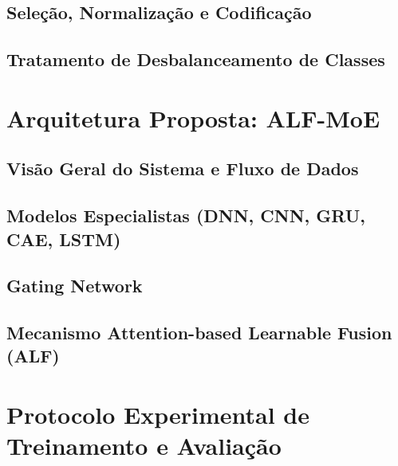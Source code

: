\subsection{Seleção, Normalização e Codificação}
\label{subsec:selecao_normalizacao}

\subsection{Tratamento de Desbalanceamento de Classes}
\label{subsec:desbalanceamento}

\section{Arquitetura Proposta: ALF-MoE}
\label{sec:arquitetura_proposta}

\subsection{Visão Geral do Sistema e Fluxo de Dados}
\label{subsec:visao_geral_alfmoe}

\subsection{Modelos Especialistas (DNN, CNN, GRU, CAE, LSTM)}
\label{subsec:especialistas}

\subsection{Gating Network}
\label{subsec:gating_network}

\subsection{Mecanismo Attention-based Learnable Fusion (ALF)}
\label{subsec:mecanismo_alf}

\section{Protocolo Experimental de Treinamento e Avaliação}
\label{sec:protocolo_experimental}

